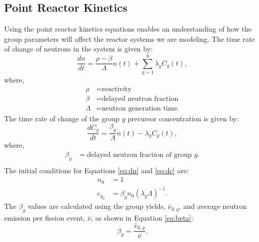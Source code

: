 \documentclass{style/nseJournal}
\begin{document}
\subsection{Point Reactor Kinetics}
\label{sec:prk}

Using the point reactor kinetics equations enables an understanding of how the group parameters will affect the reactor systems we are modeling.
The time rate of change of neutrons in the system is given by:
\begin{equation}
\frac{dn}{dt} = \frac{\rho - \beta}{\Lambda} n(t) + \sum_{g=1}^{6} \lambda_g C_g(t)
\label{eq:dn},
\end{equation}
where,
\begin{align}
\rho  & = \text{reactivity} \nonumber \\
\beta & = \text{delayed neutron fraction} \nonumber\\
\Lambda & = \text{neutron generation time.} \nonumber
\end{align}
The time rate of change of the group $g$ precursor concentration is given by: 
\begin{equation}
\frac{dC_g}{dt} = \frac{\beta_g}{\Lambda} n(t) - \lambda_g C_g(t)
\label{eq:dc},
\end{equation}
where,
\begin{equation}
    \begin{split}
\beta_g & = \text{delayed neutron fraction of group $g$.} \nonumber\\
\end{split}
\end{equation}
The initial conditions for Equations \eqref{eq:dn} and \eqref{eq:dc} are:
\begin{equation}
\begin{split}
n_0  & = 1 \nonumber \\
c_{g_0} & = \beta_g n_0 \left( \lambda_g \Lambda \right)^{-1}. \nonumber
\end{split}
\nonumber
\label{eq:initcond}
\end{equation}
The $\beta_g$ values are calculated using the group yields, $\bar{\nu}_{d, g}$,  and average neutron emission per fission event, $\bar{\nu}$, as shown in Equation \eqref{eq:beta}:
\begin{equation}
\beta_g = \frac{\bar{\nu}_{d, g}}{\bar{\nu}}
\label{eq:beta}.
\end{equation}
\end{document}
